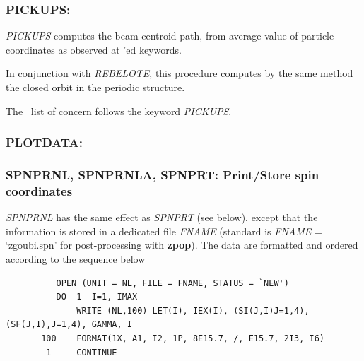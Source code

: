  



\newpage

 
\subsubsection*{PICKUPS: \PICKUPSTitl}\label{PICKUPS} 
\medskip

\noindent \textsl{PICKUPS} computes the beam centroid path, from average value of particle 
coordinates as observed at \LABEL'ed keywords.

\medskip
\noindent In conjunction with \textsl{REBELOTE}, this procedure computes by the same method the closed orbit in 
the periodic structure. 

\medskip
\noindent The \LABEL\ list of concern follows the keyword  \textsl{PICKUPS}.





\newpage


\subsubsection*{PLOTDATA: \PLOTDATATitl~\protect\cite{BiblioPlot}}%
\label{PLOTDATA} 

\bigskip


\newpage

\subsubsection*{SPNPRNL, SPNPRNLA, SPNPRT: Print/Store spin coordinates 
  }\label{SPNPRT}\label{SPNPRNL} \label{SPNPRNLA}

\textsl{SPNPRNL} has the same effect as \textsl{SPNPRT} (see 
below), except that the information is
stored in a  dedicated file \textsl{FNAME} (standard is \textsl{FNAME} = 
`zgoubi.spn' 
for post-processing with \textbf{zpop}). The data are formatted and ordered 
according to the  \FORTRAN sequence below

{\footnotesize
\begin{verbatim}
	      OPEN (UNIT = NL, FILE = FNAME, STATUS = `NEW')
	      DO  1  I=1, IMAX
	          WRITE (NL,100) LET(I), IEX(I), (SI(J,I)J=1,4), (SF(J,I),J=1,4), GAMMA, I
       100	  FORMAT(1X, A1, I2, 1P, 8E15.7, /, E15.7, 2I3, I6)
        1     CONTINUE
\end{verbatim}}
\medskip

